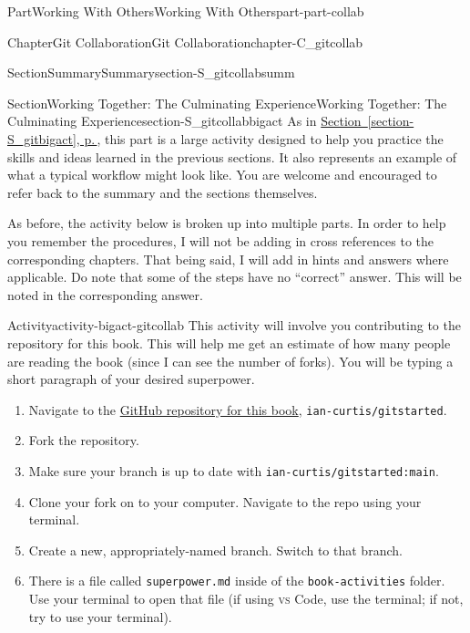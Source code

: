 \documentclass[twoside,10pt,]{book}
\newcommand{\xreffont}{\relax}
\newcommand{\mono}[1]{\texttt{#1}}
\newcommand{\initialism}[1]{\textsc{\MakeLowercase{#1}}}
\begin{document}
\begin{partptx}{Part}{Working With Others}{}{Working With Others}{}{}{part-part-collab}
\begin{chapterptx}{Chapter}{Git Collaboration}{}{Git Collaboration}{}{}{chapter-C_gitcollab}
\begin{sectionptx}{Section}{Summary}{}{Summary}{}{}{section-S_gitcollabsumm}
%
\end{sectionptx}
%
%
\typeout{************************************************}
\typeout{************************************************}
%
\begin{sectionptx}{Section}{Working Together: The Culminating Experience}{}{Working Together: The Culminating Experience}{}{}{section-S_gitcollabbigact}
%
As in \hyperref[section-S_gitbigact]{Section~{\xreffont\ref{section-S_gitbigact}}, p.\,\pageref{section-S_gitbigact}}, this part is a large activity designed to help you practice the skills and ideas learned in the previous sections. It also represents an example of what a typical workflow might look like. You are welcome and encouraged to refer back to the summary and the sections themselves.%
\par
As before, the activity below is broken up into multiple parts. In order to help you remember the procedures, I will not be adding in cross references to the corresponding chapters. That being said, I will add in hints and answers where applicable. Do note that some of the steps have no “correct” answer. This will be noted in the corresponding answer.%
\begin{activity}{Activity}{}{activity-bigact-gitcollab}%
This activity will involve you contributing to the repository for this book. This will help me get an estimate of how many people are reading the book (since I can see the number of forks). You will be typing a short paragraph of your desired superpower.%
\begin{enumerate}[font=\bfseries,label=(\alph*),ref=\alph*]%
\item{}Navigate to the \href{https://github.com/ian-curtis/gitstarted}{GitHub repository for this book}\footnotemark{}, \mono{ian-curtis/gitstarted}.%
\item{}Fork the repository.%
\item{}Make sure your branch is up to date with \mono{ian-curtis/gitstarted:main}.%
\item{}Clone your fork on to your computer. Navigate to the repo using your terminal.%
\item{}Create a new, appropriately-named branch. Switch to that branch.%
\item{}There is a file called \mono{superpower.md} inside of the \mono{book-activities} folder. Use your terminal to open that file (if using \initialism{VS} Code, use the terminal; if not, try to use your terminal).%

\end{enumerate}
\end{activity}
\end{sectionptx}
\end{chapterptx}
\end{partptx}
\end{document}
